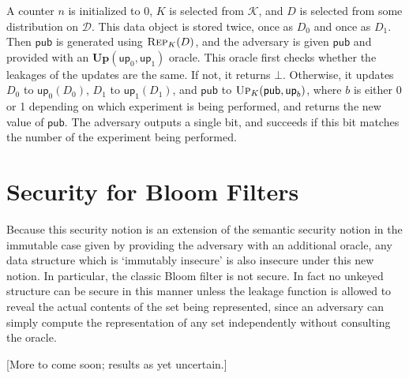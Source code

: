 \documentclass[11pt, pdftex]{article}
\begin{document}
A counter $n$ is initialized to 0, $K$ is selected from $\mathcal{K}$, and $D$ is selected from some distribution on $\mathcal{D}$. This data object is stored twice, once as $D_0$ and once as $D_1$. Then $\mathsf{pub}$ is generated using $\textsc{Rep}_K(D)$, and the adversary is given $\mathsf{pub}$ and provided with an $\mathbf{Up}(\mathsf{up}_0,\mathsf{up}_1)$ oracle. This oracle first checks whether the leakages of the updates are the same. If not, it returns $\bot$. Otherwise, it updates $D_0$ to $\mathsf{up}_0(D_0)$, $D_1$ to $\mathsf{up}_1(D_1)$, and $\mathsf{pub}$ to $\textsc{Up}_K(\mathsf{pub},\mathsf{up}_b)$, where $b$ is either 0 or 1 depending on which experiment is being performed, and returns the new value of $\mathsf{pub}$. The adversary outputs a single bit, and succeeds if this bit matches the number of the experiment being performed.

\section{Security for Bloom Filters}

Because this security notion is an extension of the semantic security notion in the immutable case given by providing the adversary with an additional oracle, any data structure which is `immutably insecure' is also insecure under this new notion. In particular, the classic Bloom filter is not secure. In fact no unkeyed structure can be secure in this manner unless the leakage function is allowed to reveal the actual contents of the set being represented, since an adversary can simply compute the representation of any set independently without consulting the oracle.

[More to come soon; results as yet uncertain.]


\end{document}
